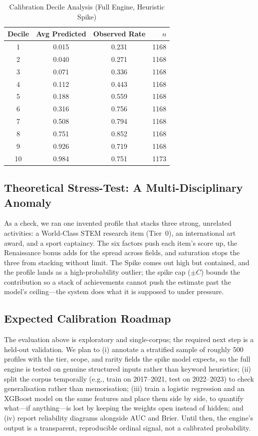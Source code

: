 \documentclass[conference]{IEEEtran}
\begin{document}
\begin{table}[!t]
\centering
\caption{Calibration Decile Analysis (Full Engine, Heuristic Spike)}
\label{tab:calibration_full}
\small
\begin{tabular}{cccr}
\hline
\textbf{Decile} & \textbf{Avg Predicted} & \textbf{Observed Rate} & $n$ \\
\hline
 1  & 0.015 & 0.231 & 1168 \\
 2  & 0.040 & 0.271 & 1168 \\
 3  & 0.071 & 0.336 & 1168 \\
 4  & 0.112 & 0.443 & 1168 \\
 5  & 0.188 & 0.559 & 1168 \\
 6  & 0.316 & 0.756 & 1168 \\
 7  & 0.508 & 0.794 & 1168 \\
 8  & 0.751 & 0.852 & 1168 \\
 9  & 0.926 & 0.719 & 1168 \\
 10 & 0.984 & 0.751 & 1173 \\
\hline
\end{tabular}
\end{table}

\subsection{Theoretical Stress-Test: A Multi-Disciplinary Anomaly}
As a check, we ran one invented profile that stacks three strong, unrelated activities: a World-Class STEM research item (Tier~0), an international art award, and a sport captaincy. The six factors push each item's score up, the Renaissance bonus adds for the spread across fields, and saturation stops the three from stacking without limit. The Spike comes out high but contained, and the profile lands as a high-probability outlier; the spike cap ($\pm C$) bounds the contribution so a stack of achievements cannot push the estimate past the model's ceiling---the system does what it is supposed to under pressure.

\subsection{Expected Calibration Roadmap}
The evaluation above is exploratory and single-corpus; the required next step is a held-out validation. We plan to (i) annotate a stratified sample of roughly 500 profiles with the tier, scope, and rarity fields the spike model expects, so the full engine is tested on genuine structured inputs rather than keyword heuristics; (ii) split the corpus temporally (e.g., train on 2017--2021, test on 2022--2023) to check generalisation rather than memorisation; (iii) train a logistic regression and an XGBoost model on the same features and place them side by side, to quantify what---if anything---is lost by keeping the weights open instead of hidden; and (iv) report reliability diagrams alongside AUC and Brier. Until then, the engine's output is a transparent, reproducible ordinal signal, not a calibrated probability.
\end{document}
